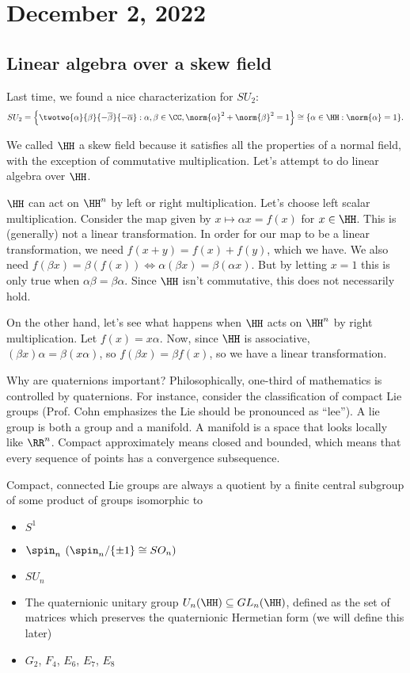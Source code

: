 \section{December 2, 2022}

\subsection{Linear algebra over a skew field}

Last time, we found a nice characterization for $SU_2$:
\[SU_2 =\left\{\twotwo{\alpha}{\beta}{-\overline{\beta}}{-\overline{\alpha}} : \alpha,\beta \in \CC, \norm{\alpha}^2+\norm{\beta}^2 = 1\right\} \cong \{\alpha\in \HH: \norm{\alpha}=1\}.\]

We called $\HH$ a \ac{skew field} because it satisfies all the properties of a normal field, with the exception of commutative multiplication. Let's attempt to do linear algebra over $\HH$. 

$\HH$ can act on $\HH^n$ by left or right multiplication. Let's choose left scalar multiplication. Consider the map given by $x\mapsto \alpha x = f(x)$ for $x\in \HH$. This is (generally) not a linear transformation. In order for our map to be a linear transformation, we need $f(x+y) = f(x)+f(y)$, which we have. We also need $f(\beta x) = \beta (f(x)) \iff \alpha (\beta x) = \beta (\alpha x)$. But by letting $x=1$ this is only true when $\alpha\beta = \beta\alpha$. Since $\HH$ isn't commutative, this does not necessarily hold. 

On the other hand, let's see what happens when $\HH$ acts on $\HH^n$ by right multiplication. Let $f(x) = x\alpha$. Now, since $\HH$ is associative, $(\beta x)\alpha = \beta (x\alpha)$, so $f(\beta x) = \beta f(x)$, so we have a linear transformation. 

\hrulebar

Why are quaternions important? Philosophically, one-third of mathematics is controlled by quaternions. For instance, consider the classification of compact Lie groups (Prof. Cohn emphasizes the Lie should be pronounced as ``lee''). A lie group is both a group and a manifold. A manifold is a space that looks locally like $\RR^n$. Compact approximately means closed and bounded, which means that every sequence of points has a convergence subsequence. 

\begin{theorem}
\thmlabel

Compact, connected Lie groups are always a quotient by a finite central subgroup of some product of groups isomorphic to
\begin{itemize}
    \item $S^1$
    \item $\spin_n$ $(\spin_n/\{\pm 1\}\cong SO_n)$
    \item $SU_n$
    \item The quaternionic unitary group $U_n(\HH)\subseteq GL_n(\HH)$, defined as the set of matrices which preserves the quaternionic Hermetian form (we will define this later)
    \item $G_2$, $F_4$, $E_6$, $E_7$, $E_8$
\end{itemize}
\end{theorem}

